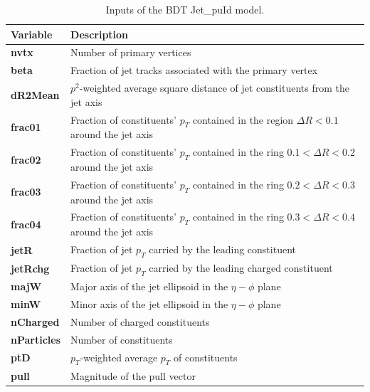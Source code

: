 \begin{minipage}{\linewidth}
\begin{minipage}{0.55\linewidth}
        \begin{table}[H]
        \centering
        \fontsize{9.2pt}{9.2pt}\selectfont
        \begin{tabular}{|l|p{6cm}|}
        \hline
        \textbf{Variable} & \textbf{Description} \\
        \hline
        \textbf{nvtx} & Number of primary vertices \\
        \hline
        \textbf{beta} & Fraction of jet tracks associated with the primary vertex \\
        \hline
        \textbf{dR2Mean} & $p^2$-weighted average square distance of jet constituents from the jet axis \\
        \hline
        \textbf{frac01} & Fraction of constituents' $p_T$ contained in the region $\Delta R < 0.1$ around the jet axis \\
        \hline
        \textbf{frac02} & Fraction of constituents' $p_T$ contained in the ring $0.1 < \Delta R < 0.2$ around the jet axis \\
        \hline
        \textbf{frac03} & Fraction of constituents' $p_T$ contained in the ring $0.2 < \Delta R < 0.3$ around the jet axis \\
        \hline
        \textbf{frac04} & Fraction of constituents' $p_T$ contained in the ring $0.3 < \Delta R < 0.4$ around the jet axis \\
        \hline
        \textbf{jetR} & Fraction of jet $p_T$ carried by the leading constituent \\
        \hline
        \textbf{jetRchg} & Fraction of jet $p_T$ carried by the leading charged constituent \\
        \hline
        \textbf{majW} & Major axis of the jet ellipsoid in the $\eta - \phi$ plane \\
        \hline
        \textbf{minW} & Minor axis of the jet ellipsoid in the $\eta - \phi$ plane \\
        \hline
        \textbf{nCharged} & Number of charged constituents \\
        \hline
        \textbf{nParticles} & Number of constituents \\
        \hline
        \textbf{ptD} & $p_T$-weighted average $p_T$ of constituents \\
        \hline
        \textbf{pull} & Magnitude of the pull vector \\
        \hline
        \end{tabular}
        \caption{Inputs of the BDT Jet\_puId model.}
        \label{tab:puId_inputs}
        \end{table}
        
    \end{minipage}
    
\end{minipage}

